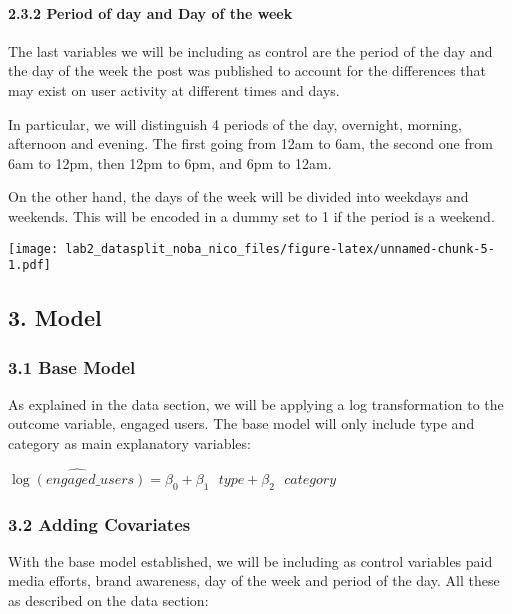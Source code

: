 \documentclass[
]{article}
\begin{document}
\hypertarget{period-of-day-and-day-of-the-week}{%
\paragraph{2.3.2 Period of day and Day of the
week}\label{period-of-day-and-day-of-the-week}}

The last variables we will be including as control are the period of the
day and the day of the week the post was published to account for the
differences that may exist on user activity at different times and days.

In particular, we will distinguish 4 periods of the day, overnight,
morning, afternoon and evening. The first going from 12am to 6am, the
second one from 6am to 12pm, then 12pm to 6pm, and 6pm to 12am.

On the other hand, the days of the week will be divided into weekdays
and weekends. This will be encoded in a dummy set to 1 if the period is
a weekend.

\texttt{[image: lab2\_datasplit\_noba\_nico\_files/figure-latex/unnamed-chunk-5-1.pdf]}

\hypertarget{model}{%
\subsection{3. Model}\label{model}}

\hypertarget{base-model}{%
\subsubsection{3.1 Base Model}\label{base-model}}

As explained in the data section, we will be applying a log
transformation to the outcome variable, engaged users. The base model
will only include type and category as main explanatory variables:

\(\widehat{\log(engaged\_users)}=\beta_0 + \beta_1 \text{ } type + \beta_2 \text{ } category\)

\hypertarget{adding-covariates}{%
\subsubsection{3.2 Adding Covariates}\label{adding-covariates}}

With the base model established, we will be including as control
variables paid media efforts, brand awareness, day of the week and
period of the day. All these as described on the data section:
\end{document}
